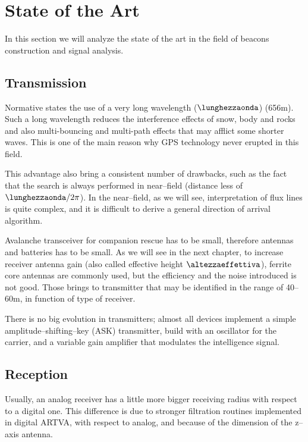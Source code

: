 \section{State of the Art}

In this section we will analyze the state of the art in the field of beacons construction and signal analysis.

\subsection{Transmission}

Normative states the use of a very long wavelength ($\lunghezzaonda$) (\num{656}\si{\meter}). Such a long wavelength reduces the interference effects of snow, body and rocks and also multi-bouncing and multi-path effects\citep{balanis2012antenna} that may afflict some shorter waves. This is one of the main reason why GPS technology never erupted in this field\citep{457andfuture}.

This advantage also bring a consistent number of drawbacks, such as the fact that the search is always performed in near--field (distance less of $\lunghezzaonda/2\pi$). In the near--field, as we will see, interpretation of flux lines is quite complex, and it is difficult to derive a general direction of arrival algorithm.

Avalanche transceiver for companion rescue has to be small, therefore antennas and batteries has to be small. As we will see in the next chapter, to increase receiver antenna gain (also called effective height $\altezzaeffettiva$), ferrite core antennas are commonly used, but the efficiency and the noise introduced is not good. Those brings to transmitter that may be identified in the range of \numrange{40}{60}\si{\meter}, in function of type of receiver.

There is no big evolution in transmitters; almost all devices implement a simple amplitude--shifting--key (ASK) transmitter, build with an oscillator for the carrier, and a variable gain amplifier that modulates the intelligence signal.

\subsection{Reception}

Usually, an analog receiver has a little more bigger receiving radius with respect to a digital one. This difference is due to stronger filtration routines implemented in digital ARTVA, with respect to analog, and because of the dimension of the z--axis antenna.


